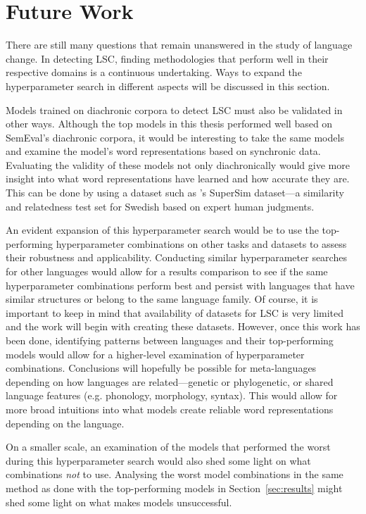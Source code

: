 \section{Future Work}
\label{sec:futurework}

There are still many questions that remain unanswered in the study of language change. In detecting LSC, finding methodologies that perform well in their respective domains is a continuous undertaking. Ways to expand the hyperparameter search in different aspects will be discussed in this section.

Models trained on diachronic corpora to detect LSC must also be validated in other ways. Although the top models in this thesis performed well based on SemEval’s diachronic corpora, it would be interesting to take the same models and examine the model’s word representations based on synchronic data. Evaluating the validity of these models not only diachronically would give more insight into what word representations have learned and how accurate they are. This can be done by using a dataset such as \citet{supersim2021}'s SuperSim dataset—a similarity and relatedness test set for Swedish based on expert human judgments. 

An evident expansion of this hyperparameter search would be to use the top-performing hyperparameter combinations on other tasks and datasets to assess their robustness and applicability. Conducting similar hyperparameter searches for other languages would allow for a results comparison to see if the same hyperparameter combinations perform best and persist with languages that have similar structures or belong to the same language family. Of course, it is important to keep in mind that availability of datasets for LSC is very limited and the work will begin with creating these datasets. However, once this work has been done, identifying patterns between languages and their top-performing models would allow for a higher-level examination of hyperparameter combinations. Conclusions will hopefully be possible for meta-languages depending on how languages are related—genetic or phylogenetic, or shared language features (e.g. phonology, morphology, syntax). This would allow for more broad intuitions into what models create reliable word representations depending on the language.

On a smaller scale, an examination of the models that performed the worst during this hyperparameter search would also shed some light on what combinations \emph{not} to use. Analysing the worst model combinations in the same method as done with the top-performing models in Section~\ref{sec:results} might shed some light on what makes models unsuccessful. 

